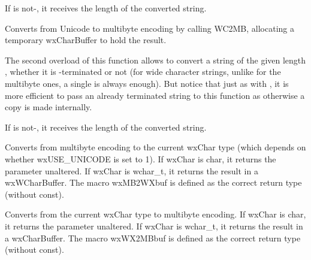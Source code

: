 If  is not-\NULL, it receives the length of the converted
string.


\label{wxmbconvcwc2mb}



Converts from Unicode to multibyte encoding by calling WC2MB,
allocating a temporary wxCharBuffer to hold the result.

The second overload of this function allows to convert a string of the given
length , whether it is \NUL-terminated or not (for wide character
strings, unlike for the multibyte ones, a single \NUL is always enough).
But notice that just as with , it is more
efficient to pass an already terminated string to this function as otherwise a
copy is made internally.

If  is not-\NULL, it receives the length of the converted
string.


\label{wxmbconvcmb2wx}



Converts from multibyte encoding to the current wxChar type
(which depends on whether wxUSE\_UNICODE is set to 1). If wxChar is char,
it returns the parameter unaltered. If wxChar is wchar\_t, it returns the
result in a wxWCharBuffer. The macro wxMB2WXbuf is defined as the correct
return type (without const).


\label{wxmbconvcwx2mb}



Converts from the current wxChar type to multibyte encoding. If wxChar is char,
it returns the parameter unaltered. If wxChar is wchar\_t, it returns the
result in a wxCharBuffer. The macro wxWX2MBbuf is defined as the correct
return type (without const).


\label{wxmbconvcwc2wx}


